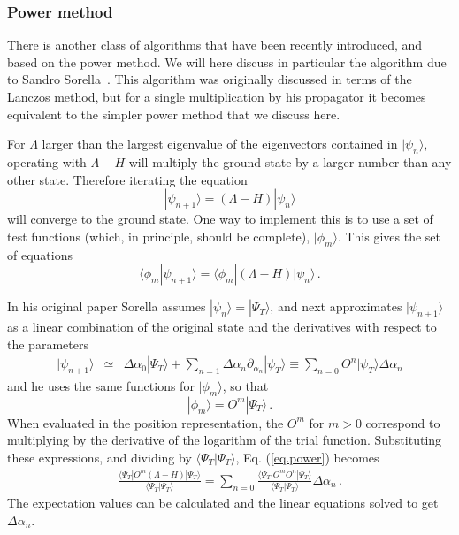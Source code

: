 \subsubsection{Power method}
\label{sec:pm}
There is another class of algorithms that have been recently introduced, and based on the power method. We will here discuss in particular the algorithm due to Sandro Sorella~\cite{Sorella01}.
This algorithm was originally discussed in terms of
the Lanczos method, but for
a single multiplication by his propagator it
becomes equivalent to the simpler power method that we discuss here.

For $\Lambda$ larger than the largest eigenvalue of the
eigenvectors contained in $|\psi_n\rangle$, operating
with $\Lambda -H$ will multiply the ground state by a larger number
than any other state. Therefore iterating the equation
\begin{equation}
|\psi_{n+1}\rangle = (\Lambda-H)|\psi_n\rangle
\end{equation}
will converge to the ground state.
One way to implement this is to use a set of test functions (which, in
principle, should be complete), $|\phi_m\rangle$. This gives the
set of equations
\begin{equation}
\label{eq.power}
\langle \phi_m |\psi_{n+1}\rangle = \langle \phi_m |(\Lambda -H)|\psi_n\rangle
\,.
\end{equation}


In his original paper Sorella assumes $|\psi_n \rangle = |\Psi_T\rangle$, and next approximates
$|\psi_{n+1}\rangle$ as a linear combination of the original state
and the derivatives with respect to the parameters
\begin{eqnarray}
\label{eq:psiprime}
|\psi_{n+1}\rangle &\simeq& \Delta \alpha_0 |\Psi_T\rangle
+\sum_{n=1} \Delta \alpha_n \partial_{\alpha_n} |\psi_T\rangle
\equiv \sum_{n=0} O^n |\psi_T\rangle \Delta \alpha_n
\end{eqnarray}
and he uses the same functions for $|\phi_m\rangle$, so that
\begin{equation}
|\phi_m\rangle = O^m |\Psi_T\rangle \,.
\end{equation}
When evaluated in the position representation, the $O^m$ for $m>0$ correspond
to multiplying by the derivative of the logarithm of the trial function.
Substituting these expressions, and dividing by $\langle \Psi_T|\Psi_T\rangle$,
Eq. (\ref{eq.power}) becomes
\begin{eqnarray}
\label{eq.first}
\frac{\langle \Psi_T |O^m (\Lambda-H) |\Psi_T\rangle}
{\langle \Psi_T |\Psi_T\rangle}
= \sum_{n=0} \frac{\langle \Psi_T |O^m O^n |\Psi_T\rangle}
{\langle \Psi_T |\Psi_T\rangle} \Delta \alpha_n\,.
\end{eqnarray}
The expectation values can be calculated and the linear equations solved
to get $\Delta \alpha_n$.

